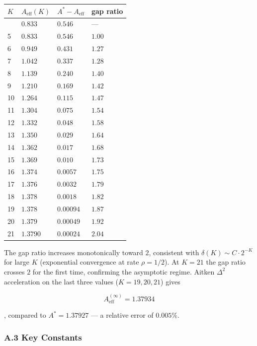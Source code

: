 \documentclass[
  11pt,
]{article}
\begin{document}
\begin{longtable}[]{@{}llll@{}}
\toprule\noalign{}
\(K\) & \(A_{\mathrm{eff}}(K)\) & \(A^{\ast} - A_{\mathrm{eff}}\) & gap ratio \\
\midrule\noalign{}
\endhead
\bottomrule\noalign{}
\endlastfoot
4 & \(0.833\) & \(0.546\) & --- \\
5 & \(0.833\) & \(0.546\) & \(1.00\) \\
6 & \(0.949\) & \(0.431\) & \(1.27\) \\
7 & \(1.042\) & \(0.337\) & \(1.28\) \\
8 & \(1.139\) & \(0.240\) & \(1.40\) \\
9 & \(1.210\) & \(0.169\) & \(1.42\) \\
10 & \(1.264\) & \(0.115\) & \(1.47\) \\
11 & \(1.304\) & \(0.075\) & \(1.54\) \\
12 & \(1.332\) & \(0.048\) & \(1.58\) \\
13 & \(1.350\) & \(0.029\) & \(1.64\) \\
14 & \(1.362\) & \(0.017\) & \(1.68\) \\
15 & \(1.369\) & \(0.010\) & \(1.73\) \\
16 & \(1.374\) & \(0.0057\) & \(1.75\) \\
17 & \(1.376\) & \(0.0032\) & \(1.79\) \\
18 & \(1.378\) & \(0.0018\) & \(1.82\) \\
19 & \(1.378\) & \(0.00094\) & \(1.87\) \\
20 & \(1.379\) & \(0.00049\) & \(1.92\) \\
21 & \(1.3790\) & \(0.00024\) & \(2.04\) \\
\end{longtable}

The gap ratio increases monotonically toward \(2\), consistent with
\(\delta(K) \sim C \cdot 2^{-K}\) for large \(K\) (exponential convergence at
rate \(\rho = 1/2\)). At \(K = 21\) the gap ratio crosses \(2\) for the first
time, confirming the asymptotic regime. Aitken \(\Delta^2\) acceleration on the
last three values (\(K = 19, 20, 21\)) gives

\[A_{\mathrm{eff}}^{(\infty)} = 1.37934\]

, compared to \(A^{\ast} = 1.37927\) --- a relative error of \(0.005\%\).

\subsubsection{A.3 Key Constants}\label{a.3-key-constants}
\end{document}
